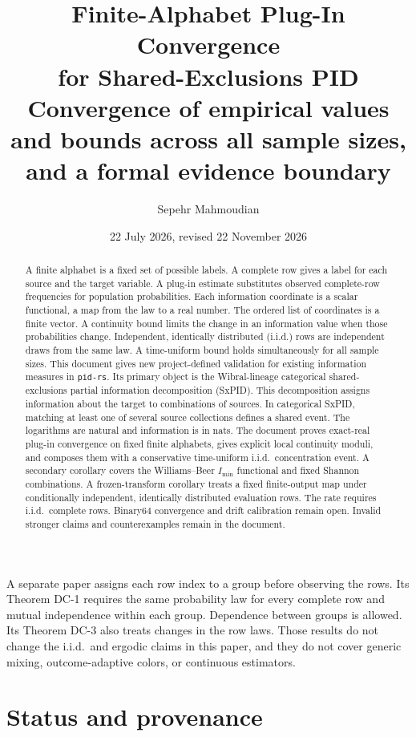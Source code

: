 \documentclass[11pt]{article}
\title{\PidReportTitle
  {Finite-Alphabet Plug-In Convergence\\for Shared-Exclusions PID}
  {Convergence of empirical values and bounds across all sample sizes,\\
   and a formal evidence boundary}}
\author{Sepehr Mahmoudian}
\date{22 July 2026, revised 22 November 2026}
\theoremstyle{definition}
\newcommand{\imin}{I_{\min}}
\begin{document}
\PidMakeTitle

\begin{abstract}
A finite alphabet is a fixed set of possible labels. A complete row gives a
label for each source and the target variable. A plug-in estimate substitutes
observed complete-row frequencies for population probabilities. Each information coordinate is a scalar functional,
a map from the law to a real number. The ordered list of coordinates is a finite vector. A continuity bound
limits the change in an information value when those probabilities change.
Independent, identically distributed (i.i.d.) rows are independent draws from
the same law. A time-uniform bound holds simultaneously for all sample sizes.
This document gives new project-defined validation for existing information measures in
\texttt{pid-rs}.  Its primary object is the Wibral-lineage categorical shared-exclusions partial
information decomposition (SxPID). This decomposition assigns information about the target to
combinations of sources. In categorical SxPID, matching at least one of several source
collections defines a shared event. The logarithms are natural and information is in nats.  The document proves
exact-real plug-in convergence on fixed finite alphabets, gives explicit local continuity moduli,
and composes them with a conservative time-uniform i.i.d.\ concentration event.  A secondary
corollary covers the Williams--Beer $\imin$ functional and fixed Shannon combinations.  A
frozen-transform corollary treats a fixed finite-output map under conditionally independent,
identically distributed evaluation rows.  The rate requires i.i.d.\ complete rows.  Binary64
convergence and drift calibration remain open.  Invalid stronger claims and
counterexamples remain in the document.
\end{abstract}

A separate paper assigns each row index to a group before observing the
rows. Its Theorem DC-1 requires the same probability law for every complete
row and mutual independence within each group. Dependence between groups is
allowed. Its Theorem DC-3 also treats changes in the row laws.  Those results do not change the i.i.d.\ and ergodic claims in this paper,
and they do not cover generic mixing, outcome-adaptive colors, or continuous estimators.

\begingroup
\small
\setlength{\parskip}{0pt}
\tableofcontents
\endgroup

\section{Status and provenance}
\end{document}
